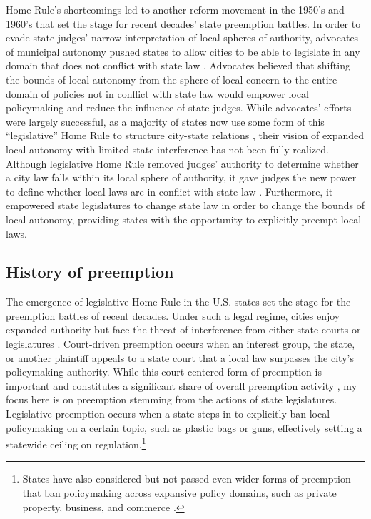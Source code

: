 \documentclass[12pt]{article}
\begin{document}
Home Rule's shortcomings led to another reform movement in the 1950's and 1960's that set the stage for recent decades' state preemption battles. In order to evade state judges' narrow interpretation of local spheres of authority, advocates of municipal autonomy pushed states to allow cities to be able to legislate in any domain that does not conflict with state law \parencite{dillerIntrastatePreemption2007}. Advocates believed that shifting the bounds of local autonomy from the sphere of local concern to the entire domain of policies not in conflict with state law would empower local policymaking and reduce the influence of state judges. While advocates' efforts were largely successful, as a majority of states now use some form of this ``legislative'' Home Rule to structure city-state relations \parencite[p. 1126]{dillerIntrastatePreemption2007}, their vision of expanded local autonomy with limited state interference has not been fully realized. Although legislative Home Rule removed judges' authority to determine whether a city law falls within its local sphere of authority, it gave judges the new power to define whether local laws are in conflict with state law \parencite{dillerIntrastatePreemption2007}. Furthermore, it empowered state legislatures to change state law in order to change the bounds of local autonomy, providing states with the opportunity to explicitly preempt local laws. 

\subsection*{History of preemption}
The emergence of legislative Home Rule in the U.S. states set the stage for the preemption battles of recent decades. Under such a legal regime, cities enjoy expanded authority but face the threat of interference from either state courts or legislatures \parencite{dillerIntrastatePreemption2007,goodmanStateLegislativeIdeology2019}. Court-driven preemption occurs when an interest group, the state, or another plaintiff appeals to a state court that a local law surpasses the city's policymaking authority. While this court-centered form of preemption is important and constitutes a significant share of overall preemption activity \parencite{swansonStateGovernmentPreemption2018,dillerIntrastatePreemption2007}, my focus here is on preemption stemming from the actions of state legislatures. Legislative preemption occurs when a state steps in to explicitly ban local policymaking on a certain topic, such as plastic bags or guns, effectively setting a statewide ceiling on regulation.\footnote{States have also considered but not passed even wider forms of preemption that ban policymaking across expansive policy domains, such as private property, business, and commerce \parencite[p. 2007]{briffaultChallengeNewPreemption2018}.}
\end{document}
